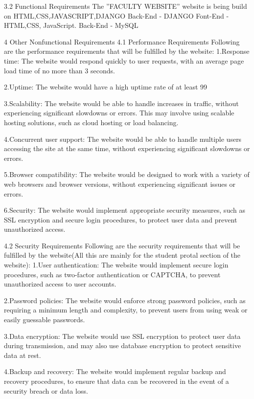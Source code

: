 3.2 Functional Requirements 
The ”FACULTY WEBSITE” website is being build on HTML,CSS,JAVASCRIPT,DJANGO
Back-End - DJANGO
Font-End - HTML,CSS, JavaScript.
Back-End - MySQL

4 Other Nonfunctional Requirements  
4.1 Performance Requirements 
Following are the performance requirements that will be fulfilled by the website:
1.Response time: The website would respond quickly to user requests, with an average page load time of no more than 3 seconds.

2.Uptime: The website would have a high uptime rate of at least 99%

3.Scalability: The website would be able to handle increases in traffic, without experiencing significant slowdowns or errors. This may involve using scalable hosting solutions, such as cloud hosting or load balancing.

4.Concurrent user support: The website would be able to handle multiple users accessing the site at the same time, without experiencing significant slowdowns or errors.

5.Browser compatibility: The website would be designed to work with a variety of web browsers and browser versions, without experiencing significant issues or errors.

6.Security: The website would implement appropriate security measures, such as SSL encryption and secure login procedures, to protect user data and prevent unauthorized access.

4.2 Security Requirements 
Following are the security requirements that will be fulfilled by the website(All this are mainly for the student protal section of the website):
1.User authentication: The website would implement secure login procedures, such as two-factor authentication or CAPTCHA, to prevent unauthorized access to user accounts.

2.Password policies: The website would enforce strong password policies, such as requiring a minimum length and complexity, to prevent users from using weak or easily guessable passwords.

3.Data encryption: The website would use SSL encryption to protect user data during transmission, and may also use database encryption to protect sensitive data at rest.

4.Backup and recovery: The website would implement regular backup and recovery procedures, to ensure that data can be recovered in the event of a security breach or data loss.

